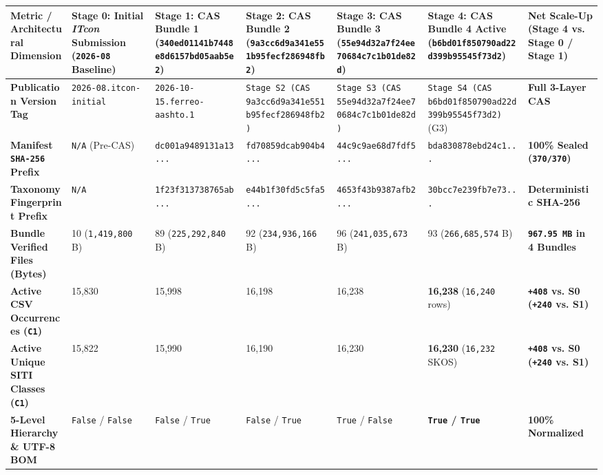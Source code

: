 \documentclass[10pt,a4paper]{article}
\begin{document}
{\scriptsize
\begin{longtable}{p{}p{}p{}p{}p{}p{}p{}}
\toprule
\textbf{Metric / Architectural Dimension} & \textbf{Stage 0: Initial \textit{ITcon} Submission (\texttt{2026-08} Baseline)} & \textbf{Stage 1: CAS Bundle 1 (\texttt{340ed01141b7448e8d6157bd05aab5e2})} & \textbf{Stage 2: CAS Bundle 2 (\texttt{9a3cc6d9a341e551b95fecf286948fb2})} & \textbf{Stage 3: CAS Bundle 3 (\texttt{55e94d32a7f24ee70684c7c1b01de82d})} & \textbf{Stage 4: CAS Bundle 4 Active (\texttt{b6bd01f850790ad22d399b95545f73d2})} & \textbf{Net Scale-Up (Stage 4 vs. Stage 0 / Stage 1)} \\
\midrule
\endhead
\textbf{Publication Version Tag} & \texttt{2026-08.itcon-initial} & \texttt{2026-10-15.ferreo-aashto.1} & \texttt{Stage S2 (CAS 9a3cc6d9a341e551b95fecf286948fb2)} & \texttt{Stage S3 (CAS 55e94d32a7f24ee70684c7c1b01de82d)} & \texttt{Stage S4 (CAS b6bd01f850790ad22d399b95545f73d2)} (G3) & \textbf{Full 3-Layer CAS} \\
\textbf{Manifest \texttt{SHA-256} Prefix} & \texttt{N/A} (Pre-CAS) & \texttt{dc001a9489131a13...} & \texttt{fd70859dcab904b4...} & \texttt{44c9c9ae68d7fdf5...} & \texttt{bda830878ebd24c1...} & \textbf{100\% Sealed (\texttt{370/370})} \\
\textbf{Taxonomy Fingerprint Prefix} & \texttt{N/A} & \texttt{1f23f313738765ab...} & \texttt{e44b1f30fd5c5fa5...} & \texttt{4653f43b9387afb2...} & \texttt{30bcc7e239fb7e73...} & \textbf{Deterministic SHA-256} \\
\textbf{Bundle Verified Files (Bytes)} & 10 (\texttt{1,419,800} B) & 89 (\texttt{225,292,840} B) & 92 (\texttt{234,936,166} B) & 96 (\texttt{241,035,673} B) & 93 (\texttt{266,685,574} B) & \textbf{\texttt{967.95 MB} in 4 Bundles} \\
\textbf{Active CSV Occurrences (\texttt{C1})} & 15,830 & 15,998 & 16,198 & 16,238 & \textbf{16,238} (\texttt{16,240} rows) & \textbf{\texttt{+408} vs. S0 (\texttt{+240} vs. S1)} \\
\textbf{Active Unique SITI Classes (\texttt{C1})} & 15,822 & 15,990 & 16,190 & 16,230 & \textbf{16,230} (\texttt{16,232} SKOS) & \textbf{\texttt{+408} vs. S0 (\texttt{+240} vs. S1)} \\
\textbf{5-Level Hierarchy \& UTF-8 BOM} & \texttt{False} / \texttt{False} & \texttt{False} / \texttt{True} & \texttt{False} / \texttt{True} & \texttt{True} / \texttt{False} & \textbf{\texttt{True} / \texttt{True}} & \textbf{100\% Normalized} \\

\end{longtable}}
\end{document}

